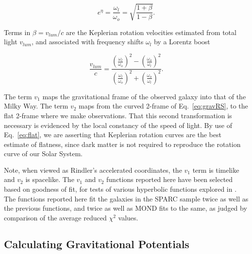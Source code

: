 \documentclass[reprint,%
 amsmath,amssymb,
 aps,
]{revtex4-1}
\begin{document}
\begin{equation}
    e^{\eta}=\frac{\omega_{l}}{\omega_o}= \sqrt{\frac{1+\beta}{1-\beta}}.
    \label{eq:flat}
\end{equation}  
     
Terms in 
$\beta = v_{lum}/c$ are the
Keplerian rotation velocities  estimated from total light  $v_{lum}$, and  associated with  frequency shifts $\omega_{l}$      by a Lorentz boost   

 \begin{equation}
 \frac{v_{lum} }{c}=
\frac{  \left( \frac{\omega_{l}}{\omega_o}\right)^2 -  \left( \frac{\omega_o}{\omega_{l}} \right)^2 }{  \left( \frac{\omega_{l}}{\omega_o}\right)^2  +  \left( \frac{\omega_o}{\omega_{l}}\right)^2 }. 
\label{eq:lumlorentz}
\end{equation} 
 
 
  
 
 
The   term $v_1$ maps the gravitational frame of the observed galaxy into that of the Milky Way. The   term $v_2$    maps from  the   curved 2-frame  of  Eq.~\ref{eq:gravRS},  to  the flat 2-frame where we make observations. 
  That this second transformation  is necessary is evidenced by the local constancy of the speed of light. 
By use of Eq.~\ref{eq:flat}, we are  asserting  that Keplerian rotation curves are     the best estimate of flatness, since dark matter is not required to  reproduce the rotation curve of our Solar System.
 
    
  
 
 Note, when viewed as    Rindler's accelerated coordinates\cite{MTW,Wald, rindler2013essential}, the   $v_1$ term is  timelike   and $v_2$ is spacelike. The  $v_1$ and $v_2$ functions reported here have been   selected based on goodness of fit, for tests of various hyperbolic functions  explored in   \cite{Cisneros:2013vha,Cisneros:2014fea,Cisneros2015,Cisn2016}. 
 The    functions 
 reported here fit the galaxies in the SPARC sample twice as well as the previous functions,  and twice as well as MOND fits to the same, as judged  by comparison of the  average reduced $\chi^{2}$ values. 
 
  
 
\subsection{Calculating Gravitational Potentials \label{sec:gravDets}}
\end{document}
